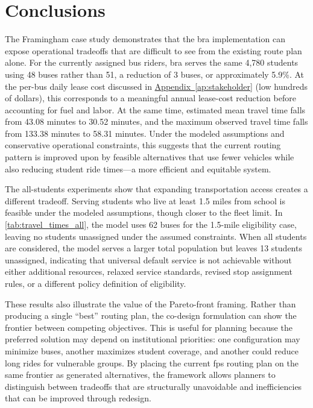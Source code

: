 \chapter{Conclusions}
\label{ch:conclusions}

The Framingham case study demonstrates that the \gls{bra} implementation can expose operational tradeoffs that are difficult to see from the existing route plan alone. For the currently assigned bus riders, \gls{bra} serves the same 4,780 students using 48 buses rather than 51, a reduction of 3 buses, or approximately 5.9\%. At the per-bus daily lease cost discussed in \hyperref[ap:stakeholder]{Appendix~\ref*{ap:stakeholder}} (low hundreds of dollars), this corresponds to a meaningful annual lease-cost reduction before accounting for fuel and labor. At the same time, estimated mean travel time falls from 43.08 minutes to 30.52 minutes, and the maximum observed travel time falls from 133.38 minutes to 58.31 minutes. Under the modeled assumptions and conservative operational constraints, this suggests that the current routing pattern is improved upon by feasible alternatives that use fewer vehicles while also reducing student ride times---a more efficient and equitable system.

The all-students experiments show that expanding transportation access creates a different tradeoff. Serving students who live at least 1.5 miles from school is feasible under the modeled assumptions, though closer to the fleet limit. In \autoref{tab:travel_times_all}, the model uses 62 buses for the 1.5-mile eligibility case, leaving no students unassigned under the assumed constraints. When all students are considered, the model serves a larger total population but leaves 13 students unassigned, indicating that universal default service is not achievable without either additional resources, relaxed service standards, revised stop assignment rules, or a different policy definition of eligibility.

These results also illustrate the value of the Pareto-front framing. Rather than producing a single ``best'' routing plan, the co-design formulation can show the frontier between competing objectives. This is useful for planning because the preferred solution may depend on institutional priorities: one configuration may minimize buses, another maximizes student coverage, and another could reduce long rides for vulnerable groups. By placing the current \gls{fps} routing plan on the same frontier as generated alternatives, the framework allows planners to distinguish between tradeoffs that are structurally unavoidable and inefficiencies that can be improved through redesign.

